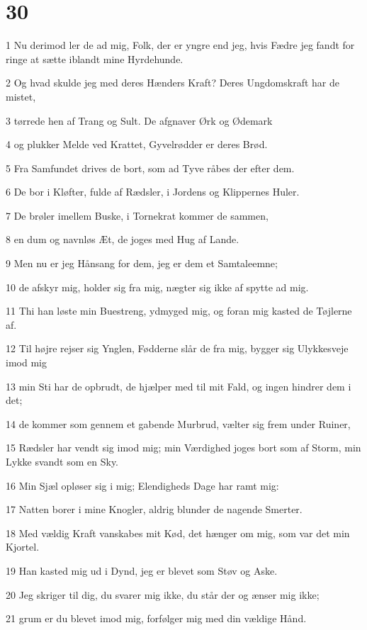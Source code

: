 \chapter{30}

\par 1 Nu derimod ler de ad mig, Folk, der er yngre end jeg, hvis Fædre jeg fandt for ringe at sætte iblandt mine Hyrdehunde.
\par 2 Og hvad skulde jeg med deres Hænders Kraft? Deres Ungdomskraft har de mistet,
\par 3 tørrede hen af Trang og Sult. De afgnaver Ørk og Ødemark
\par 4 og plukker Melde ved Krattet, Gyvelrødder er deres Brød.
\par 5 Fra Samfundet drives de bort, som ad Tyve råbes der efter dem.
\par 6 De bor i Kløfter, fulde af Rædsler, i Jordens og Klippernes Huler.
\par 7 De brøler imellem Buske, i Tornekrat kommer de sammen,
\par 8 en dum og navnløs Æt, de joges med Hug af Lande.
\par 9 Men nu er jeg Hånsang for dem, jeg er dem et Samtaleemne;
\par 10 de afskyr mig, holder sig fra mig, nægter sig ikke af spytte ad mig.
\par 11 Thi han løste min Buestreng, ydmyged mig, og foran mig kasted de Tøjlerne af.
\par 12 Til højre rejser sig Ynglen, Fødderne slår de fra mig, bygger sig Ulykkesveje imod mig
\par 13 min Sti har de opbrudt, de hjælper med til mit Fald, og ingen hindrer dem i det;
\par 14 de kommer som gennem et gabende Murbrud, vælter sig frem under Ruiner,
\par 15 Rædsler har vendt sig imod mig; min Værdighed joges bort som af Storm, min Lykke svandt som en Sky.
\par 16 Min Sjæl opløser sig i mig; Elendigheds Dage har ramt mig:
\par 17 Natten borer i mine Knogler, aldrig blunder de nagende Smerter.
\par 18 Med vældig Kraft vanskabes mit Kød, det hænger om mig, som var det min Kjortel.
\par 19 Han kasted mig ud i Dynd, jeg er blevet som Støv og Aske.
\par 20 Jeg skriger til dig, du svarer mig ikke, du står der og ænser mig ikke;
\par 21 grum er du blevet imod mig, forfølger mig med din vældige Hånd.

